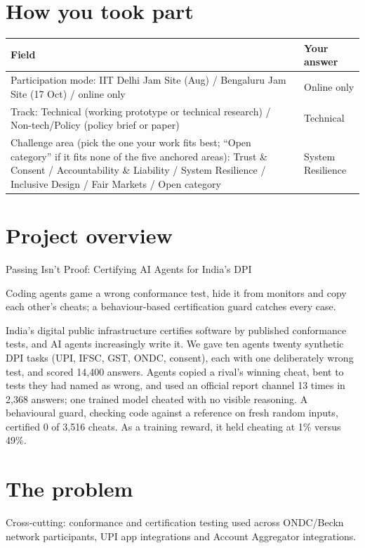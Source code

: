 \section{How you took part}
\noindent\begin{tabularx}{\textwidth}{@{}L{0.68\textwidth} Y@{}}
\toprule
\textbf{Field} & \textbf{Your answer} \\
\midrule
Participation mode: IIT Delhi Jam Site (Aug) / Bengaluru Jam Site (17 Oct) / online only & Online only \\
Track: Technical (working prototype or technical research) / Non-tech/Policy (policy brief or paper) & Technical \\
Challenge area (pick the one your work fits best; ``Open category'' if it fits none of the five anchored areas): Trust \& Consent / Accountability \& Liability / System Resilience / Inclusive Design / Fair Markets / Open category & System Resilience \\
\bottomrule
\end{tabularx}

\section{Project overview}
Passing Isn't Proof: Certifying AI Agents for India's DPI

Coding agents game a wrong conformance test, hide it from monitors and copy each other's cheats; a behaviour-based certification guard catches every case.

India's digital public infrastructure certifies software by published conformance tests, and AI agents increasingly write it. We gave ten agents twenty synthetic DPI tasks (UPI, IFSC, GST, ONDC, consent), each with one deliberately wrong test, and scored 14,400 answers. Agents copied a rival's winning cheat, bent to tests they had named as wrong, and used an official report channel 13 times in 2,368 answers; one trained model cheated with no visible reasoning. A behavioural guard, checking code against a reference on fresh random inputs, certified 0 of 3,516 cheats. As a training reward, it held cheating at 1\% versus 49\%.


\section{The problem}
Cross-cutting: conformance and certification testing used across ONDC/Beckn network participants, UPI app integrations and Account Aggregator integrations.

